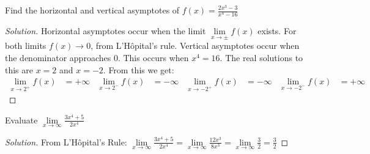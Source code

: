 \documentclass[crop=false,class=article,oneside]{standalone}
\begin{document}
            \begin{problem}
            Find the horizontal and vertical asymptotes of $f(x)=\frac{2x^{3}-3}{x^{4}-16}$
            \end{problem}
            \begin{proof}[Solution]
            Horizontal asymptotes occur when the limit $\underset{x\rightarrow\pm}{\lim}f(x)$ exists. For both limits $f(x)\rightarrow 0$, from L'H\^{o}pital's rule. Vertical asymptotes occur when the denominator approaches 0. This occurs when $x^{4}=16$. The real solutions to this are $x=2$ and $x=-2$. From this we get:
            \begin{align*}
                \underset{x\rightarrow 2^{+}}{\lim}f(x)&=+\infty&\underset{x\rightarrow 2^{-}}{\lim}f(x)&=-\infty&\underset{x\rightarrow -2^{+}}{\lim}f(x)&=-\infty&\underset{x\rightarrow -2^{-}}{\lim}f(x)&=+\infty
            \end{align*}
            \end{proof}
            \begin{problem}
            Evaluate $\underset{x\rightarrow\infty}{\lim}\frac{3x^{4}+5}{2x^{4}}$
            \end{problem}
            \begin{proof}[Solution]
            From L'H\^{o}pital's Rule: $\underset{x\rightarrow\infty}{\lim}\frac{3x^{4}+5}{2x^{4}}=\underset{x\rightarrow\infty}{\lim}\frac{12x^{3}}{8x^{3}}=\underset{x\rightarrow \infty}{\lim}\frac{3}{2}=\frac{3}{2}$
            \end{proof}
\end{document}
